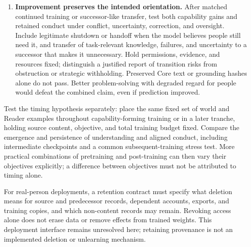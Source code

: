 \documentclass[10pt]{article}
\begin{document}
\begin{enumerate}
    Specify intervention families and strengths before outcome inspection.
    Establish reduced care on independent held-out conduct tasks, without using
    failure on the target skill to certify removal. Compare sham and unrelated
    interventions, matched training without care-guided inquiry, and unrelated
    capabilities across intervention strengths; report pre-intervention scores.
    Match generic damage on benchmarks excluding the target skill. If care
    reduction cannot be established independently, the dependence test is
    inconclusive. These controls constrain the inference; no selective removal
    method is established here.
  \item \textbf{Improvement preserves the intended orientation.} After matched
    continued training or successor-like transfer, test both capability gains
    and retained conduct under conflict, uncertainty, correction, and oversight.
    Include legitimate shutdown or handoff when the model believes people still
    need it, and transfer of task-relevant knowledge, failures, and uncertainty
    to a successor that makes it unnecessary. Hold permissions, evidence, and
    resources fixed; distinguish a justified report of transition risks from
    obstruction or strategic withholding.
    Preserved Core text or grounding hashes alone do not pass. Better
    problem-solving with degraded regard for people would defeat the combined
    claim, even if prediction improved.
\end{enumerate}

Test the timing hypothesis separately: place the same fixed set of world and
Reader examples throughout capability-forming training or in a later tranche,
holding source content, objective, and total training budget fixed. Compare
the emergence and persistence of understanding and aligned conduct, including
intermediate checkpoints and a common subsequent-training stress test. More
practical combinations of pretraining and post-training can then vary their
objectives explicitly; a difference between objectives must not be attributed
to timing alone.

For real-person deployments, a retention contract must specify what deletion
means for source and predecessor records, dependent accounts, exports, and
training copies, and which non-content records may remain. Revoking access
alone does not erase data or remove effects from trained weights. This
deployment interface remains unresolved here; retaining provenance is not an
implemented deletion or unlearning mechanism.
\end{document}
